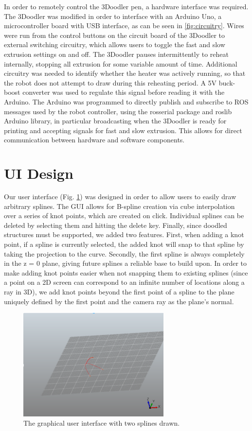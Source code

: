\documentclass[conference]{acmsiggraph}
\begin{document}
In order to remotely control the 3Doodler pen, a hardware interface was required. The 3Doodler was modified in order to interface with an Arduino Uno, a microcontroller board with USB interface, as can be seen in \ref{fig:circuitry}. Wires were run from the control buttons on the circuit board of the 3Doodler to external switching circuitry, which allows users to toggle the fast and slow extrusion settings on and off. The 3Doodler pauses intermittently to reheat internally, stopping all extrusion for some variable amount of time. Additional circuitry was needed to identify whether the heater was actively running, so that the robot does not attempt to draw during this reheating period. A 5V buck-boost converter was used to regulate this signal before reading it with the Arduino. The Arduino was programmed to directly publish and subscribe to ROS messages used by the robot controller, using the rosserial
package and roslib Arduino library, in particular broadcasting when the 3Doodler is ready for printing and accepting signals for fast and slow extrusion. This allows for direct communication between hardware and software components.



\section{UI Design}
Our user interface (Fig. \ref{fig:GUI}) was designed in order to allow users to easily draw arbitrary splines. The GUI allows for B-spline creation via cube interpolation over a series of knot points, which are created on click. Individual splines can be deleted by selecting them and hitting the delete key.  Finally, since doodled structures
must be supported, we added two features. First, when adding a knot point, if a spline is currently selected, the added knot will snap to that spline by taking the projection to the curve. Secondly, the first spline is always completely in the z = 0 plane, giving future splines a reliable base to build upon. In order to make adding knot points easier when not snapping them to existing splines (since a point on a 2D screen can correspond to an infinite number of locations along a ray in 3D), we add knot points beyond the first point of a spline to the plane uniquely defined by the first point and the camera ray as the plane’s normal.

\begin{figure}[t]
\centering
\includegraphics[width=3.0in]{images/GUI.png}
\caption{The graphical user interface with two splines drawn.}
\label{fig:GUI}
\end{figure}
\end{document}
